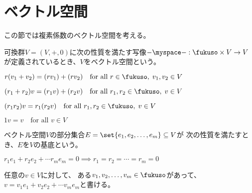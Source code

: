 \begingroup %
	\newcommand{\End}{\ensuremath{\myop{End}}}
	\newcommand{\Hom}{\ensuremath{\myop{Hom}}}
	\newcommand{\onto}{\ensuremath{\myop{onto}}}
	\newcommand{\im}{\ensuremath{\myop{im}}}
	\newcommand{\spanall}{\ensuremath{\myop{span}}}
	\newcommand{\spanfin}{\ensuremath{\myop{finite-span}}}
	\newcommand{\rank}{\ensuremath{\myop{rank}}}
	\newcommand{\dom}{\ensuremath{\myop{dom}}}
	\newcommand{\codom}{\ensuremath{\myop{cod}}}
	\newcommand{\defeq}{\ensuremath{\overset{\mathrm{def}}{=}}}
	\newcommand{\be}{\ensuremath{\mathbf{e}}}
	\newcommand{\bE}{\ensuremath{\mathbf{E}}}
	\newcommand{\lead}{\ensuremath{\myop{lead}}}
	\newcommand{\dup}{\myop{dup}}
	\newcommand{\myid}{\myop{id}}
\section{ベクトル空間}\label{s1:ベクトル空間} %
	この節では複素係数のベクトル空間を考える。

	\begin{definition}[ベクトル空間]\label{def:ベクトル空間} %
		可換群$V=(V,+,0)$に次の性質を満たす写像$-\myspace-:\fukuso\times V\to V$
		が定義されているとき、$V$をベクトル空間という。
		\begin{description}\setlength{\itemsep}{-1mm} %
			\item[分配性]$
				r(v_1+v_2) = (rv_1) + (rv_2)
				\quad\text{for all }r\in\fukuso,\;v_1,v_2\in V
			$
			\item[分配性]$
				(r_1+r_2)v = (r_1v) + (r_2v)
				\quad\text{for all }r_1,r_2\in\fukuso,\;v\in V
			$
			\item[結合性]$
				(r_1r_2)v = r_1(r_2v)
				\quad\text{for all }r_1,r_2\in\fukuso,\;v\in V
			$
			\item[単位性]$
				1v = v \quad\text{for all }v\in V
			$
		\end{description} %
	\end{definition} %

	\begin{definition}[ベクトル空間の基底]\label{def:ベクトル空間の基底} %
		ベクトル空間$V$の部分集合$E=\set{e_1,e_2,\dots,e_m}\subseteq V$が
		次の性質を満たすとき、$E$を$V$の基底という。
		\begin{description}\setlength{\itemsep}{-1mm} %
			\item[線形独立]$
			r_1e_1 + r_2e_2 + \cdots r_me_m = 0
			\implies r_1 = r_2 = \cdots = r_m = 0
			$
			\item[生成系]任意の$v\in V$に対して、
			ある$v_1,v_2,\dots,v_m\in\fukuso$があって、
			$v = v_1e_1 + v_2e_2 + \cdots v_me_m$と書ける。
		\end{description} %
	\end{definition} %

